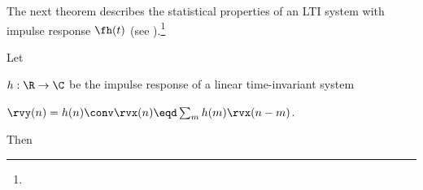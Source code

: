 The next theorem describes the statistical properties of an LTI system
with impulse response $\fh(t)$
(see ).\footnote{}

\begin{theorem}
Let
\begin{liste}
   \item $h:\R\to\C$ be the impulse response of a linear time-invariant system
   \item $\rvy(n)=h(n)\conv \rvx(n) \eqd \sum_m h(m)\rvx(n-m)$.
\end{liste}

Then

\begin{fsM}
\end{fsM}
\end{theorem}

